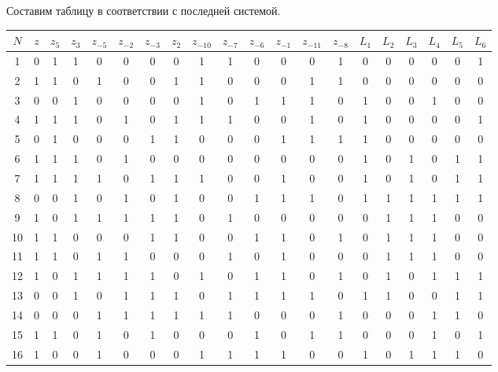 \documentclass[letterpaper,11pt,openany]{book}
\begin{document}
Составим таблицу в соответствии с последней системой.

\medskip

\begin{adjustbox}{center}
\begin{tabular}{||c|c|c|c|c|c|c|c|c|c|c|c|c|c|c|c|c|c|c|c||}
\hline
$N$ & $z$ & $z_5$ & $z_3$ & $z_{-5}$ & $z_{-2}$ & $z_{-3}$ & $z_{2}$ & $z_{-10}$ & $z_{-7}$ & $z_{-6}$ & $z_{-1}$ & $z_{-11}$ & $z_{-8}$ & $L_1$ & $L_2$ & $L_3$ & $L_4$ & $L_5$ & $L_6$\\
\hline
1 & 0 & 1 & 1 & 0 & 0 & 0 & 0 & 1 & 1 & 0 & 0 & 0 & 1 & 0 & 0 & 0 & 0 & 0 & 1 \\
\hline
2 & 1 & 1 & 0 & 1 & 0 & 0 & 1 & 1 & 0 & 0 & 0 & 1 & 1 & 0 & 0 & 0 & 0 & 0 & 0 \\
\hline
3 & 0 & 0 & 1 & 0 & 0 & 0 & 0 & 1 & 0 & 1 & 1 & 1 & 0 & 1 & 0 & 0 & 1 & 0 & 0 \\
\hline
4 & 1 & 1 & 1 & 0 & 1 & 0 & 1 & 1 & 1 & 0 & 0 & 1 & 0 & 1 & 0 & 0 & 0 & 0 & 1 \\
\hline
5 & 0 & 1 & 0 & 0 & 0 & 1 & 1 & 0 & 0 & 0 & 1 & 1 & 1 & 1 & 0 & 0 & 0 & 0 & 0 \\
\hline
6 & 1 & 1 & 1 & 0 & 1 & 0 & 0 & 0 & 0 & 0 & 0 & 0 & 0 & 1 & 0 & 1 & 0 & 1 & 1 \\
\hline
7 & 1 & 1 & 1 & 1 & 0 & 1 & 1 & 1 & 0 & 0 & 1 & 0 & 0 & 1 & 0 & 1 & 0 & 1 & 1 \\
\hline
8 & 0 & 0 & 1 & 0 & 1 & 0 & 1 & 0 & 0 & 1 & 1 & 1 & 0 & 1 & 1 & 1 & 1 & 1 & 1 \\
\hline
9 & 1 & 0 & 1 & 1 & 1 & 1 & 1 & 0 & 1 & 0 & 0 & 0 & 0 & 0 & 1 & 1 & 1 & 0 & 0 \\
\hline
10 & 1 & 1 & 0 & 0 & 0 & 1 & 1 & 0 & 0 & 1 & 1 & 0 & 1 & 0 & 1 & 1 & 1 & 0 & 0 \\
\hline
11 & 1 & 1 & 0 & 1 & 1 & 0 & 0 & 0 & 1 & 0 & 1 & 0 & 0 & 0 & 1 & 1 & 1 & 0 & 0 \\
\hline
12 & 1 & 0 & 1 & 1 & 1 & 1 & 0 & 1 & 0 & 1 & 1 & 0 & 1 & 0 & 1 & 0 & 1 & 1 & 1 \\
\hline
13 & 0 & 0 & 1 & 0 & 1 & 1 & 1 & 0 & 1 & 1 & 1 & 1 & 0 & 1 & 1 & 0 & 0 & 1 & 1 \\
\hline
14 & 0 & 0 & 0 & 1 & 1 & 1 & 1 & 1 & 1 & 0 & 0 & 0 & 1 & 0 & 0 & 0 & 1 & 1 & 0 \\
\hline
15 & 1 & 1 & 0 & 1 & 0 & 1 & 0 & 0 & 0 & 1 & 0 & 1 & 1 & 0 & 0 & 0 & 1 & 0 & 1 \\
\hline
16 & 1 & 0 & 0 & 1 & 0 & 0 & 0 & 1 & 1 & 1 & 1 & 0 & 0 & 1 & 0 & 1 & 1 & 1 & 0 \\

\end{tabular}
\end{adjustbox}
\end{document}
